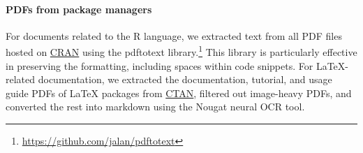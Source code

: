 \documentclass[10pt]{article} %
\begin{document}

\paragraph{PDFs from package managers} For documents related to the R language, we extracted text from all PDF files hosted on \href{https://cran.r-project.org}{CRAN} using the pdftotext library.\footnote{\url{https://github.com/jalan/pdftotext}} This library is particularly effective in preserving the formatting, including spaces within code snippets.
For LaTeX-related documentation, we extracted the documentation, tutorial, and usage guide PDFs of LaTeX packages from \href{https://ctan.org/}{CTAN}, filtered out image-heavy PDFs, and converted the rest into markdown using the Nougat neural OCR tool.
\end{document}
